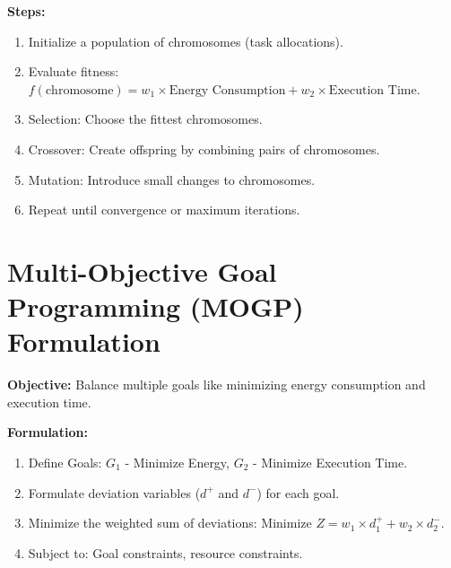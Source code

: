 \documentclass{article}
\begin{document}
\textbf{Steps:}
\begin{enumerate}
    \item Initialize a population of chromosomes (task allocations).
    \item Evaluate fitness: \(f(\text{chromosome}) = w_1 \times \text{Energy Consumption} + w_2 \times \text{Execution Time}\).
    \item Selection: Choose the fittest chromosomes.
    \item Crossover: Create offspring by combining pairs of chromosomes.
    \item Mutation: Introduce small changes to chromosomes.
    \item Repeat until convergence or maximum iterations.
\end{enumerate}

\section*{Multi-Objective Goal Programming (MOGP) Formulation}
\textbf{Objective:} Balance multiple goals like minimizing energy consumption and execution time.

\textbf{Formulation:}
\begin{enumerate}
    \item Define Goals: \(G_1\) - Minimize Energy, \(G_2\) - Minimize Execution Time.
    \item Formulate deviation variables (\(d^+\) and \(d^-\)) for each goal.
    \item Minimize the weighted sum of deviations: \(\text{Minimize } Z = w_1 \times d_1^+ + w_2 \times d_2^-\).
    \item Subject to: Goal constraints, resource constraints.
\end{enumerate}
\end{document}
